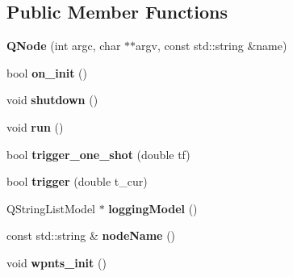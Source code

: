 \subsection*{Public Member Functions}
\begin{DoxyCompactItemize}
\item 
{\bfseries Q\+Node} (int argc, char $\ast$$\ast$argv, const std\+::string \&name)\hypertarget{class_q_node_af26ee8c152283b4a1999dc5d4bd67908}{}\label{class_q_node_af26ee8c152283b4a1999dc5d4bd67908}

\item 
bool {\bfseries on\+\_\+init} ()\hypertarget{class_q_node_a32d00dbcf15c277e08caabf95af04f6e}{}\label{class_q_node_a32d00dbcf15c277e08caabf95af04f6e}

\item 
void {\bfseries shutdown} ()\hypertarget{class_q_node_a770568addece696138f515d38408ff5c}{}\label{class_q_node_a770568addece696138f515d38408ff5c}

\item 
void {\bfseries run} ()\hypertarget{class_q_node_ae585b201389c51a177fa5e2fde252c84}{}\label{class_q_node_ae585b201389c51a177fa5e2fde252c84}

\item 
bool {\bfseries trigger\+\_\+one\+\_\+shot} (double tf)\hypertarget{class_q_node_a65f0fc9f27f336150f33b53a7c51d80b}{}\label{class_q_node_a65f0fc9f27f336150f33b53a7c51d80b}

\item 
bool {\bfseries trigger} (double t\+\_\+cur)\hypertarget{class_q_node_a23bd7e0744ad4c7b5d5464485375bef1}{}\label{class_q_node_a23bd7e0744ad4c7b5d5464485375bef1}

\item 
Q\+String\+List\+Model $\ast$ {\bfseries logging\+Model} ()\hypertarget{class_q_node_a0a6dae02f9e317488095367203fa8a58}{}\label{class_q_node_a0a6dae02f9e317488095367203fa8a58}

\item 
const std\+::string \& {\bfseries node\+Name} ()\hypertarget{class_q_node_ac21ae24311df97ac0e15c97179763b0e}{}\label{class_q_node_ac21ae24311df97ac0e15c97179763b0e}

\item 
void {\bfseries wpnts\+\_\+init} ()\hypertarget{class_q_node_a2b1b82bfd6e5e6187fe8216ba840bb09}{}\label{class_q_node_a2b1b82bfd6e5e6187fe8216ba840bb09}

\end{DoxyCompactItemize}
